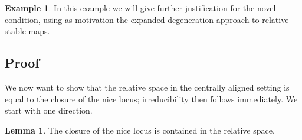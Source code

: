 \documentclass[11pt]{amsart}
\theoremstyle{definition}
\newtheorem{lem}[thm]{Lemma}
\theoremstyle{definition}
\newtheorem{example}[thm]{Example}
\begin{document}
\begin{example} In this example we will give further justification for the novel condition, using as motivation the expanded degeneration approach to relative stable maps.

\end{example}

\subsection{Proof}
We now want to show that the relative space in the centrally aligned setting is equal to the closure of the nice locus; irreducibility then follows immediately. We start with one direction.

\begin{lem}
The closure of the nice locus is contained in the relative space.
\end{lem}
\end{document}
